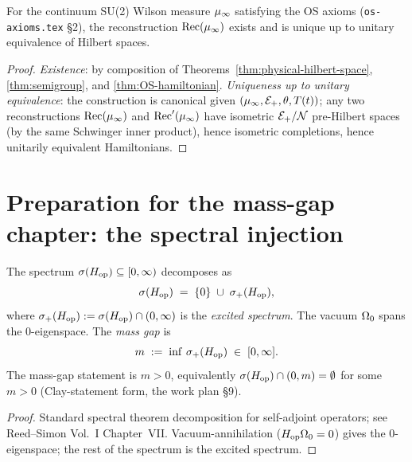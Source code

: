 \begin{theorem}
\label{thm:reconstruction-existence}
For the continuum SU(2) Wilson measure $\mu_\infty$ satisfying the OS
axioms (\texttt{os-axioms.tex} \S2), the reconstruction
$\mathrm{Rec}(\mu_\infty)$ exists and is unique up to unitary equivalence
of Hilbert spaces.
\end{theorem}

\begin{proof}
\emph{Existence}: by composition of
Theorems~\ref{thm:physical-hilbert-space}, \ref{thm:semigroup}, and
\ref{thm:OS-hamiltonian}.  \emph{Uniqueness up to unitary
equivalence}: the construction is canonical given $(\mu_\infty, \mathcal{E}_+,
\theta, T(t))$; any two reconstructions
$\mathrm{Rec}(\mu_\infty)$ and $\mathrm{Rec}'(\mu_\infty)$ have isometric
$\mathcal{E}_+ / \mathcal{N}$ pre-Hilbert spaces (by the same Schwinger inner
product), hence isometric completions, hence unitarily equivalent
Hamiltonians.
\end{proof}

\section{Preparation for the mass-gap chapter: the spectral injection}
\label{sec:phase-9-prep}

\begin{proposition}
\label{prop:spectral-mass-gap}
The spectrum $\sigma(H_{\mathrm{op}}) \subseteq [0, \infty)$ decomposes as
\begin{equation*}
  \sigma(H_{\mathrm{op}}) \;=\; \{0\} \;\cup\; \sigma_+(H_{\mathrm{op}}),
\end{equation*}
where $\sigma_+(H_{\mathrm{op}}) := \sigma(H_{\mathrm{op}}) \cap (0, \infty)$ is the
\emph{excited spectrum}.  The vacuum $\Omega_0$ spans the
$0$-eigenspace.  The \emph{mass gap} is
\begin{equation*}
  m \;:=\; \inf \, \sigma_+(H_{\mathrm{op}}) \;\in\; [0, \infty].
\end{equation*}
The mass-gap statement is $m > 0$, equivalently
$\sigma(H_{\mathrm{op}}) \cap (0, m) = \emptyset$ for some $m > 0$
(Clay-statement form, the work plan \S9).
\end{proposition}

\begin{proof}
Standard spectral theorem decomposition for self-adjoint operators;
see Reed--Simon Vol.~I Chapter~VII.  Vacuum-annihilation
($H_{\mathrm{op}} \Omega_0 = 0$) gives the $0$-eigenspace; the rest of the
spectrum is the excited spectrum.
\end{proof}

